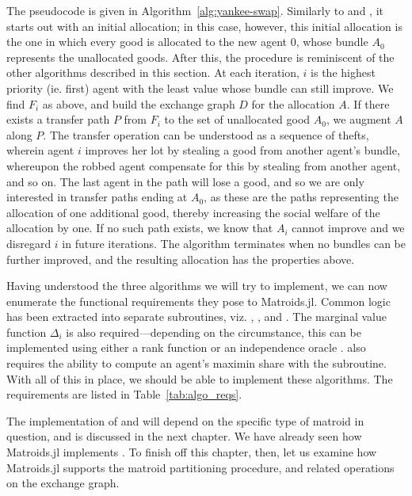 The pseudocode is given in Algorithm~\ref{alg:yankee-swap}. Similarly to  and , it starts out with an initial allocation; in this case, however, this initial allocation is the one in which every good is allocated to the new agent $0$, whose bundle $A_0$ represents the unallocated goods. After this, the procedure is reminiscent of the other algorithms described in this section. At each iteration, $i$ is the highest priority (ie. first) agent with the least value whose bundle can still improve. We find $F_i$ as above, and build the exchange graph $D$ for the allocation $A$. If there exists a transfer path $P$ from $F_i$ to the set of unallocated good $A_0$, we augment $A$ along $P$. The transfer operation can be understood as a sequence of thefts, wherein agent $i$ improves her lot by stealing a good from another agent's bundle, whereupon the robbed agent compensate for this by stealing from another agent, and so on. The last agent in the path will lose a good, and so we are only interested in transfer paths ending at $A_0$, as these are the paths representing the allocation of one additional good, thereby increasing the social welfare of the allocation by one. If no such path exists, we know that $A_i$ cannot improve and we disregard $i$ in future iterations. The algorithm terminates when no bundles can be further improved, and the resulting allocation has the properties above.

Having understood the three algorithms we will try to implement, we can now enumerate the functional requirements they pose to Matroids.jl. Common logic has been extracted into separate subroutines, viz. , ,  and . The marginal value function $\Delta_i$ is also required---depending on the circumstance, this can be implemented using either a rank function  or an independence oracle .  also requires the ability to compute an agent's maximin share with the  subroutine. With all of this in place, we should be able to implement these algorithms. The requirements are listed in Table~\ref{tab:algo_reqs}.

The implementation of  and  will depend on the specific type of matroid in question, and is discussed in the next chapter. We have already seen how Matroids.jl implements . To finish off this chapter, then, let us examine how Matroids.jl supports the matroid partitioning procedure, and related operations on the exchange graph.

